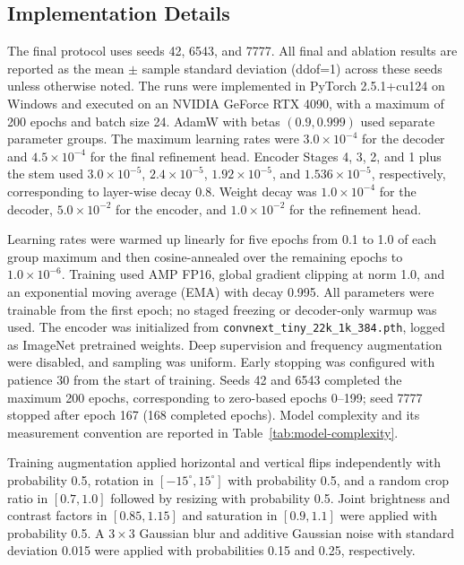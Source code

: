 \subsection{Implementation Details}\label{implementation-details}

The final protocol uses seeds 42, 6543, and 7777. All final and ablation
results are reported as the mean $\pm$ sample standard deviation (ddof=1) across
these seeds unless otherwise noted. The runs were implemented
in PyTorch 2.5.1+cu124 on Windows and executed on an NVIDIA GeForce RTX 4090,
with a maximum of 200 epochs and batch size 24.
AdamW with betas
$(0.9,0.999)$ used separate parameter groups. The maximum learning rates
were $3.0\times10^{-4}$ for the decoder and $4.5\times10^{-4}$ for the
final refinement head. Encoder Stages 4, 3, 2, and 1 plus the stem used
$3.0\times10^{-5}$, $2.4\times10^{-5}$, $1.92\times10^{-5}$, and
$1.536\times10^{-5}$, respectively, corresponding to layer-wise decay
0.8. Weight decay was $1.0\times10^{-4}$ for the decoder,
$5.0\times10^{-2}$ for the encoder, and $1.0\times10^{-2}$ for the
refinement head.

Learning rates were warmed up linearly for five epochs from 0.1 to 1.0
of each group maximum and then cosine-annealed over the remaining epochs
to $1.0\times10^{-6}$. Training used AMP FP16, global gradient clipping
at norm 1.0, and an exponential moving average (EMA) with decay 0.995.
All parameters were trainable from the first epoch; no staged freezing
or decoder-only warmup was used. The encoder was initialized from
\texttt{convnext\_tiny\_22k\_1k\_384.pth}, logged as ImageNet pretrained
weights. Deep supervision and frequency augmentation were disabled, and
sampling was uniform. Early stopping was configured with patience 30
from the start of training. Seeds 42 and 6543 completed the maximum 200
epochs, corresponding to zero-based epochs 0--199; seed 7777 stopped after
epoch 167 (168 completed epochs). Model complexity and
its measurement convention are reported in Table~\ref{tab:model-complexity}.

Training augmentation applied horizontal and vertical flips independently
with probability 0.5, rotation in $[-15^{\circ},15^{\circ}]$ with
probability 0.5, and a random crop ratio in $[0.7,1.0]$ followed by
resizing with probability 0.5. Joint brightness and contrast factors in
$[0.85,1.15]$ and saturation in $[0.9,1.1]$ were applied with probability
0.5. A $3\times3$ Gaussian blur and additive Gaussian noise with standard
deviation 0.015 were applied with probabilities 0.15 and 0.25,
respectively.

